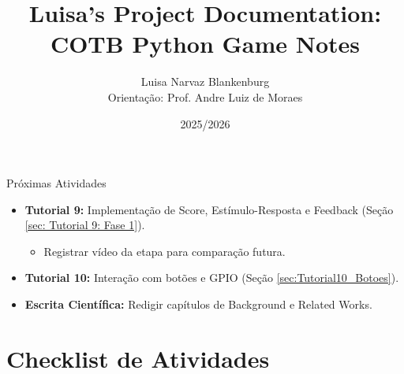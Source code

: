\documentclass[11pt,a4paper]{article}
\title{\textbf{\color{azulIFSC}Luisa's Project Documentation: \\ COTB Python Game Notes}}
\author{Luisa Narvaz Blankenburg \\ \small Orientação: Prof. Andre Luiz de Moraes}
\date{2025/2026}
\begin{document}
\maketitle

\tableofcontents


\begin{boxAvisos}{Próximas Atividades}
    \begin{itemize}
        \item \textbf{Tutorial 9:} Implementação de Score, Estímulo-Resposta e Feedback (Seção \ref{sec: Tutorial 9: Fase 1}).
            \begin{itemize}
                \item Registrar vídeo da etapa para comparação futura.
            \end{itemize}
        \item \textbf{Tutorial 10:} Interação com botões e GPIO (Seção \ref{sec:Tutorial10_Botoes}).
        \item \textbf{Escrita Científica:} Redigir capítulos de Background e Related Works.
    \end{itemize}
\end{boxAvisos}
 \section{Checklist de Atividades}
\end{document}

